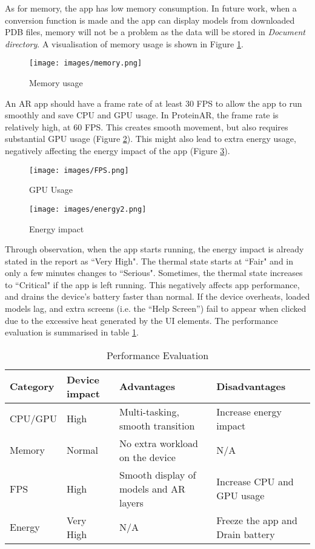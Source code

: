 As for memory, the app has low memory consumption. In future work, when a conversion function is made and the app can display models from downloaded PDB files, memory will not be a problem as the data will be stored in \emph{Document directory}. A visualisation of memory usage is shown in Figure \ref{fig:memory}.

 \begin{figure}[!htp]
	\centering
	\texttt{[image: images/memory.png]}
	\caption{Memory usage}
	\label{fig:memory}
\end{figure}

An AR app should have a frame rate of at least 30 FPS to allow the app to run smoothly and save CPU and GPU usage. In ProteinAR, the frame rate is relatively high, at 60 FPS. This creates smooth movement, but also requires substantial GPU usage (Figure \ref{fig:FPS}). This might also lead to extra energy usage, negatively affecting the energy impact of the app (Figure \ref{fig:energy2}). 

 \begin{figure}[!htp]
	\centering
	\texttt{[image: images/FPS.png]}
	\caption{GPU Usage}
	\label{fig:FPS}
\end{figure}

 \begin{figure}[!htp]
	\centering
	\texttt{[image: images/energy2.png]}
	\caption{Energy impact}
	\label{fig:energy2}
\end{figure}

Through observation, when the app starts running, the energy impact is already stated in the report as ``Very High". The thermal state starts at ``Fair" and in only a few minutes changes to ``Serious". Sometimes, the thermal state increases to ``Critical" if the app is left running. 
This negatively affects app performance, and drains the device’s battery faster than normal. If the device overheats, loaded models lag, and extra screens (i.e. the “Help Screen”) fail to appear when clicked due to the excessive heat generated by the UI elements.
The performance evaluation is summarised in table \ref{tab:perEvaluation}.

\begin{table}[!h]
\centering
\begin{tabular}{| m{} | m{} | m{}| m{}|}
\hline
Category & Device impact & Advantages & Disadvantages \\
\hline
\hline
CPU/GPU& High & Multi-tasking, smooth transition & Increase energy impact  \\
\hline
Memory & Normal & No extra workload on the device & N/A \\
\hline
FPS & High & Smooth display of models and AR layers & Increase CPU and GPU usage \\
\hline
Energy & Very High & N/A & Freeze the app and Drain battery \\
\hline
\end{tabular}
\caption {Performance Evaluation}
\label{tab:perEvaluation}
\end{table}


